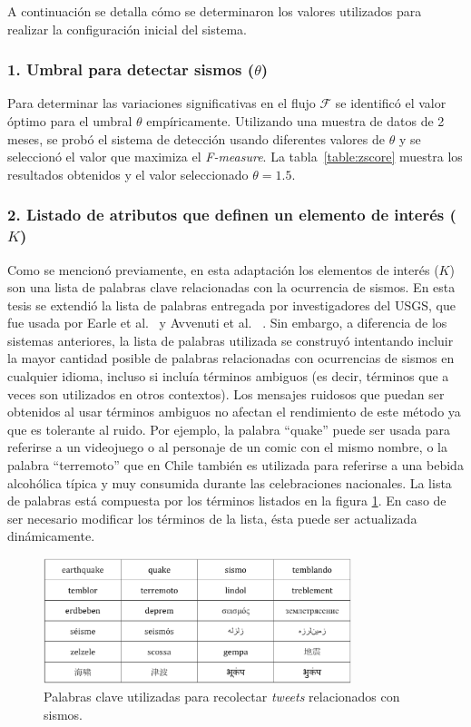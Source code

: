 	A continuación se detalla cómo se determinaron los valores utilizados para realizar la configuración inicial del sistema. 

	\subsubsection*{1. Umbral para detectar sismos ($\theta$)}
	Para determinar las variaciones significativas en el flujo $\mathcal{F}$ se identificó el valor óptimo para el umbral $\theta$ empíricamente. 
	Utilizando una muestra de datos de 2 meses, se probó el sistema de detección usando diferentes valores de $\theta$ y se seleccionó el valor que maximiza el {\em F-measure}.
	La tabla~\ref{table:zscore} muestra los resultados obtenidos y el valor seleccionado $\theta=1.5$.
	


	\subsubsection*{2. Listado de atributos que definen un elemento de interés ($K$)} 
	Como se mencionó previamente, en esta adaptación los elementos de interés ($K$) son una lista de palabras clave relacionadas con la ocurrencia de sismos.
	En esta tesis se extendió la lista de palabras entregada por investigadores del USGS, que fue usada por Earle et al.~\cite{earle2012twitter} y Avvenuti et al.~	\cite{avvenuti2014earthquake,avvenuti2014ears}.
	Sin embargo, a diferencia de los sistemas anteriores, la lista de palabras utilizada se construyó intentando incluir la mayor cantidad posible de palabras relacionadas con ocurrencias de sismos en cualquier idioma, incluso si incluía términos ambiguos (es decir, términos que a veces son utilizados en otros contextos).
	Los mensajes ruidosos que puedan ser obtenidos al usar términos ambiguos no afectan el rendimiento de este método ya que es tolerante al ruido. 
	Por ejemplo, la palabra ``quake'' puede ser usada para referirse a un videojuego o al personaje de un comic con el mismo nombre, o la palabra ``terremoto'' que en Chile también es utilizada para referirse a una bebida alcohólica típica y muy consumida durante las celebraciones nacionales. 
	La lista de palabras está compuesta por los términos listados en la figura \ref{img:keywords}. 
	En caso de ser necesario modificar los términos de la lista, ésta puede ser actualizada dinámicamente.
	
	\begin{figure}[h!]
	\centering
	\includegraphics[width=0.8\textwidth]{imagenes/Keywords.pdf}
	\caption{Palabras clave utilizadas para recolectar \textit{tweets} relacionados con sismos.}
	\label{img:keywords}
	\end{figure}
	
